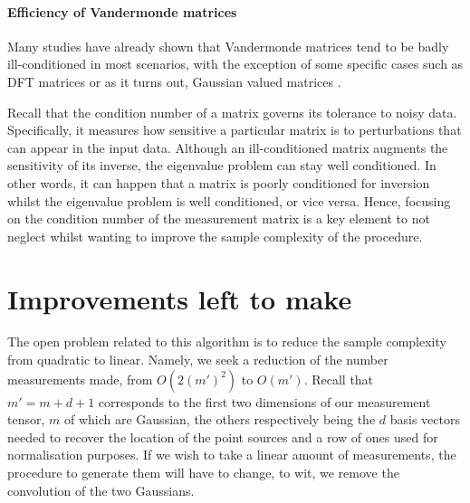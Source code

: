\paragraph{Efficiency of Vandermonde matrices} Many studies have already shown that Vandermonde matrices tend to be badly ill-conditioned in most scenarios, with the exception of some specific cases such as DFT matrices or as it turns out, Gaussian valued matrices \cite{vandermondeMatrices}.\par 
Recall that the condition number of a matrix governs its tolerance to noisy data. Specifically, it measures how sensitive a particular matrix is to perturbations that can appear in the input data. Although an ill-conditioned matrix augments the sensitivity of its inverse, the eigenvalue problem can stay well conditioned. In other words, it can happen that a matrix is poorly conditioned for inversion whilst the eigenvalue problem is well conditioned, or vice versa. Hence, focusing on the condition number of the measurement matrix is a key element to not neglect whilst wanting to improve the sample complexity of the procedure.
\section{Improvements left to make}
The open problem related to this algorithm is to reduce the sample complexity from quadratic to linear. Namely, we seek a reduction of the number measurements made, from $O(2(m')^2)$ to $O(m')$. Recall that $m'=m+d+1$ corresponds to the first two dimensions of our measurement tensor, $m$ of which are Gaussian, the others respectively being the $d$ basis vectors needed to recover the location of the point sources and a row of ones used for normalisation purposes. If we wish to take a linear amount of measurements, the procedure to generate them will have to change, to wit, we remove the convolution of the two Gaussians. 